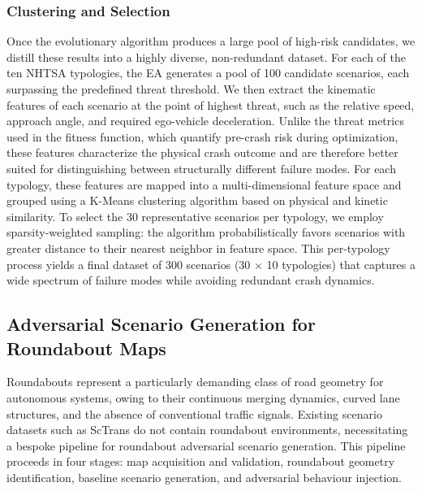 \subsubsection{Clustering and Selection}
Once the evolutionary algorithm produces a large pool of high-risk candidates, we distill these results into a highly diverse, non-redundant dataset. For each of the ten NHTSA typologies, the EA generates a pool of 100 candidate scenarios, each surpassing the predefined threat threshold. We then extract the kinematic features of each scenario at the point of highest threat, such as the relative speed, approach angle, and required ego-vehicle deceleration. Unlike the threat metrics used in the fitness function, which quantify pre-crash risk during optimization, these features characterize the physical crash outcome and are therefore better suited for distinguishing between structurally different failure modes. For each typology, these features are mapped into a multi-dimensional feature space and grouped using a K-Means clustering algorithm based on physical and kinetic similarity. To select the 30 representative scenarios per typology, we employ sparsity-weighted sampling: the algorithm probabilistically favors scenarios with greater distance to their nearest neighbor in feature space. This per-typology process yields a final dataset of 300 scenarios (30 $\times$ 10 typologies) that captures a wide spectrum of failure modes while avoiding redundant crash dynamics.


\subsection{Adversarial Scenario Generation for Roundabout Maps}
Roundabouts represent a particularly demanding class of road geometry for autonomous systems, owing to their continuous merging dynamics, curved lane structures, and the absence of conventional traffic signals. Existing scenario datasets such as ScTrans do not contain roundabout environments, necessitating a bespoke pipeline for roundabout adversarial scenario generation. This pipeline proceeds in four stages: map acquisition and validation, roundabout geometry identification, baseline scenario generation, and adversarial behaviour injection.

